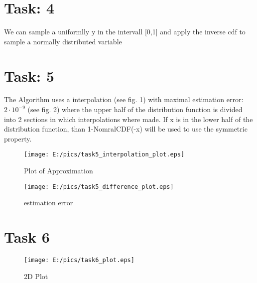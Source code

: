 \documentclass{article}
\begin{document}
\section*{Task: 4} %
We can sample a uniformlly y in the intervall [0,1] and apply the inverse cdf to sample a normally distributed variable

\newpage
\section*{Task: 5} %
The Algorithm uses a interpolation (see fig. 1) with maximal estimation error: $2\cdot 10^{-9}$ (see fig. 2) where the upper half of the distribution function is divided into 2 sections in which interpolations where made. 
If x is in the lower half of the distribution function, than 1-NomralCDF(-x) will be used to use the symmetric property.
\begin{figure}[htbp]
	\centering
		\texttt{[image: E:/pics/task5\_interpolation\_plot.eps]}
		\caption{Plot of Approximation}
	\label{fig:task5_interpolation_plot}
\end{figure}
\begin{figure}[htbp]
	\centering
		\texttt{[image: E:/pics/task5\_difference\_plot.eps]}
	\caption{estimation error}
	\label{fig:task5_difference_plot}
\end{figure}

\newpage
\section*{Task 6}
\begin{figure}[htbp]
	\centering
		\texttt{[image: E:/pics/task6\_plot.eps]}
	\caption{2D Plot}
	\label{fig:task6_plot}
\end{figure}
\end{document}

